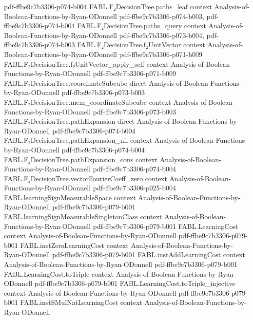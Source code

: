 \begin{theorem}
{    pdf-ffbe9c7b3306-p074-b004}
\proofstep
  {FABL.F₂DecisionTree.paths_leaf}
  {context}
  {Analysis-of-Boolean-Functions-by-Ryan-ODonnell}
  {pdf-ffbe9c7b3306-p074-b003,
    pdf-ffbe9c7b3306-p074-b004}
\proofstep
  {FABL.F₂DecisionTree.paths_query}
  {context}
  {Analysis-of-Boolean-Functions-by-Ryan-ODonnell}
  {pdf-ffbe9c7b3306-p073-b004,
    pdf-ffbe9c7b3306-p074-b003}
\proofstep
  {FABL.F₂DecisionTree.f₂UnitVector}
  {context}
  {Analysis-of-Boolean-Functions-by-Ryan-ODonnell}
  {pdf-ffbe9c7b3306-p071-b009}
\proofstep
  {FABL.F₂DecisionTree.f₂UnitVector_apply_self}
  {context}
  {Analysis-of-Boolean-Functions-by-Ryan-ODonnell}
  {pdf-ffbe9c7b3306-p071-b009}
\proofstep
  {FABL.F₂DecisionTree.coordinateSubcube}
  {direct}
  {Analysis-of-Boolean-Functions-by-Ryan-ODonnell}
  {pdf-ffbe9c7b3306-p073-b003}
\proofstep
  {FABL.F₂DecisionTree.mem_coordinateSubcube}
  {context}
  {Analysis-of-Boolean-Functions-by-Ryan-ODonnell}
  {pdf-ffbe9c7b3306-p073-b003}
\proofstep
  {FABL.F₂DecisionTree.pathExpansion}
  {direct}
  {Analysis-of-Boolean-Functions-by-Ryan-ODonnell}
  {pdf-ffbe9c7b3306-p074-b004}
\proofstep
  {FABL.F₂DecisionTree.pathExpansion_nil}
  {context}
  {Analysis-of-Boolean-Functions-by-Ryan-ODonnell}
  {pdf-ffbe9c7b3306-p074-b004}
\proofstep
  {FABL.F₂DecisionTree.pathExpansion_cons}
  {context}
  {Analysis-of-Boolean-Functions-by-Ryan-ODonnell}
  {pdf-ffbe9c7b3306-p074-b004}
\proofstep
  {FABL.F₂DecisionTree.vectorFourierCoeff_zero}
  {context}
  {Analysis-of-Boolean-Functions-by-Ryan-ODonnell}
  {pdf-ffbe9c7b3306-p025-b004}
\proofstep
  {FABL.learningSignMeasurableSpace}
  {context}
  {Analysis-of-Boolean-Functions-by-Ryan-ODonnell}
  {pdf-ffbe9c7b3306-p079-b001}
\proofstep
  {FABL.learningSignMeasurableSingletonClass}
  {context}
  {Analysis-of-Boolean-Functions-by-Ryan-ODonnell}
  {pdf-ffbe9c7b3306-p079-b001}
\proofstep
  {FABL.LearningCost}
  {context}
  {Analysis-of-Boolean-Functions-by-Ryan-ODonnell}
  {pdf-ffbe9c7b3306-p079-b001}
\proofstep
  {FABL.instZeroLearningCost}
  {context}
  {Analysis-of-Boolean-Functions-by-Ryan-ODonnell}
  {pdf-ffbe9c7b3306-p079-b001}
\proofstep
  {FABL.instAddLearningCost}
  {context}
  {Analysis-of-Boolean-Functions-by-Ryan-ODonnell}
  {pdf-ffbe9c7b3306-p079-b001}
\proofstep
  {FABL.LearningCost.toTriple}
  {context}
  {Analysis-of-Boolean-Functions-by-Ryan-ODonnell}
  {pdf-ffbe9c7b3306-p079-b001}
\proofstep
  {FABL.LearningCost.toTriple_injective}
  {context}
  {Analysis-of-Boolean-Functions-by-Ryan-ODonnell}
  {pdf-ffbe9c7b3306-p079-b001}
\proofstep
  {FABL.instSMulNatLearningCost}
  {context}
  {Analysis-of-Boolean-Functions-by-Ryan-ODonnell}

\end{theorem}

